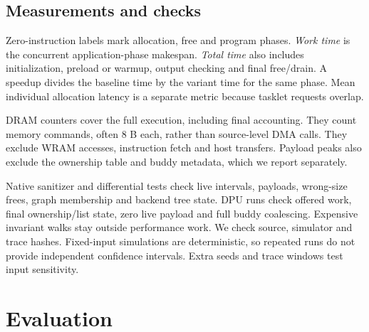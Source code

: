 \documentclass[conference]{IEEEtran}
\begin{document}
\subsection{Measurements and checks}
Zero-instruction labels mark allocation, free and program phases. \emph{Work time} is the concurrent application-phase makespan. \emph{Total time} also includes initialization, preload or warmup, output checking and final free/drain. A speedup divides the baseline time by the variant time for the same phase. Mean individual allocation latency is a separate metric because tasklet requests overlap.

DRAM counters cover the full execution, including final accounting. They count memory commands, often 8 B each, rather than source-level DMA calls. They exclude WRAM accesses, instruction fetch and host transfers. Payload peaks also exclude the ownership table and buddy metadata, which we report separately.

Native sanitizer and differential tests check live intervals, payloads, wrong-size frees, graph membership and backend tree state. DPU runs check offered work, final ownership/list state, zero live payload and full buddy coalescing. Expensive invariant walks stay outside performance work. We check source, simulator and trace hashes. Fixed-input simulations are deterministic, so repeated runs do not provide independent confidence intervals. Extra seeds and trace windows test input sensitivity.

\section{Evaluation}\label{sec:evaluation}
\end{document}
